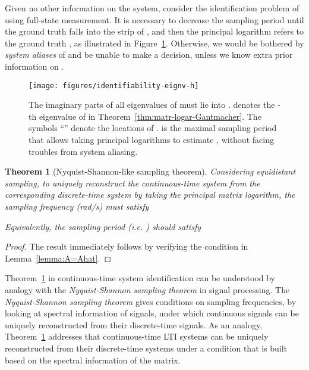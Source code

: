 \documentclass[letterpaper,10pt,journal,final]{IEEEtran}
\newtheorem{theorem}{Theorem}
\theoremstyle{definition}
\theoremstyle{remark}
\begin{document}
Given no other information on the system, consider the identification problem of 
using full-state measurement. It is necessary to decrease the sampling period 
until the ground truth falls into the strip of , and then the
principal logarithm refers to the ground truth , as illustrated in
Figure~\ref{fig:h-vs-eigv-identifi}. Otherwise, we would be bothered by \emph{system
  aliases} of  and be unable to make a decision, unless we know extra prior
information on .

\begin{figure}[htb]
 \centering
 \texttt{[image: figures/identifiability-eignv-h]}
 \caption{The imaginary parts of all eigenvalues of  must lie into .  denotes the -th eigenvalue of  in Theorem~\ref{thm:matr-logar-Gantmacher}. The symbols ``{\tiny}'' denote the locations of .  is the maximal sampling period that allows taking principal logarithms to estimate , without facing troubles from system aliasing.}
 \label{fig:h-vs-eigv-identifi}
\end{figure}


\begin{theorem}[Nyquist-Shannon-like sampling theorem]
  \label{thm:identifi-largest-sampl-period}
  Considering equidistant sampling, to uniquely reconstruct the continuous-time
  system  from the corresponding discrete-time system  by taking the
  principal matrix logarithm, the sampling frequency  \textup{(rad/s)}
  must satisfy
  
  Equivalently, the sampling period  (i.e. ) should satisfy
  
\end{theorem}

\begin{proof}
  The result immediately follows by verifying the condition  in Lemma~\ref{lemma:A=Ahat}.
\end{proof}

Theorem~\ref{thm:identifi-largest-sampl-period} in continuous-time system
identification can be understood by analogy with the \emph{Nyquist-Shannon
  sampling theorem} in signal processing. The \emph{Nyquist-Shannon sampling
  theorem} gives conditions on sampling frequencies, by looking at spectral
information of signals, under which continuous signals can be uniquely
reconstructed from their discrete-time signals. As an analogy,
Theorem~\ref{thm:identifi-largest-sampl-period} addresses that continuous-time
LTI systems can be uniquely reconstructed from their discrete-time systems under
a condition that is built based on the spectral information of the  matrix.
\end{document}
